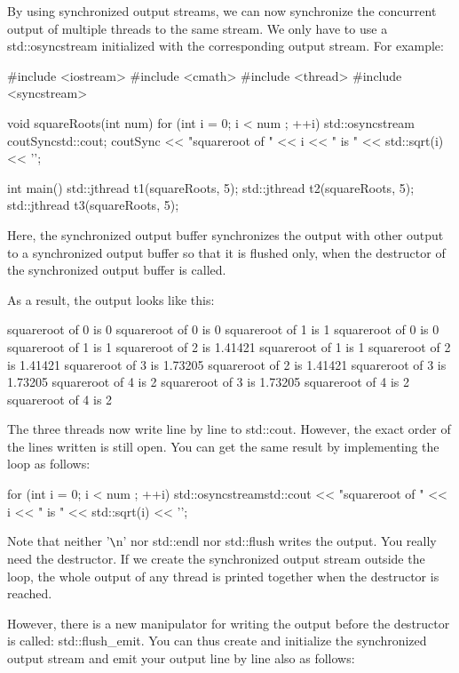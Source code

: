 By using synchronized output streams, we can now synchronize the concurrent output of multiple threads to the same stream. We only have to use a std::osyncstream initialized with the corresponding output stream. For example:


\begin{cpp}
#include <iostream>
#include <cmath>
#include <thread>
#include <syncstream>

void squareRoots(int num)
{
	for (int i = 0; i < num ; ++i) {
		std::osyncstream coutSync{std::cout};
		coutSync << "squareroot of " << i << " is "
		<< std::sqrt(i) << '\n';
	}
}

int main()
{
	std::jthread t1(squareRoots, 5);
	std::jthread t2(squareRoots, 5);
	std::jthread t3(squareRoots, 5);
}
\end{cpp}

Here, the synchronized output buffer synchronizes the output with other output to a synchronized output buffer so that it is flushed only, when the destructor of the synchronized output buffer is called.

As a result, the output looks like this:

\begin{shell}
squareroot of 0 is 0
squareroot of 0 is 0
squareroot of 1 is 1
squareroot of 0 is 0
squareroot of 1 is 1
squareroot of 2 is 1.41421
squareroot of 1 is 1
squareroot of 2 is 1.41421
squareroot of 3 is 1.73205
squareroot of 2 is 1.41421
squareroot of 3 is 1.73205
squareroot of 4 is 2
squareroot of 3 is 1.73205
squareroot of 4 is 2
squareroot of 4 is 2
\end{shell}

The three threads now write line by line to std::cout. However, the exact order of the lines written is still open. You can get the same result by implementing the loop as follows:

\begin{cpp}
for (int i = 0; i < num ; ++i) {
	std::osyncstream{std::cout} << "squareroot of " << i << " is "
								<< std::sqrt(i) << '\n';
}
\end{cpp}

Note that neither ’\verb|\|n’ nor std::endl nor std::flush writes the output. You really need the destructor. If we create the synchronized output stream outside the loop, the whole output of any thread is printed together when the destructor is reached.

However, there is a new manipulator for writing the output before the destructor is called: std::flush\_emit. You can thus create and initialize the synchronized output stream and emit your output line by line also as follows:

